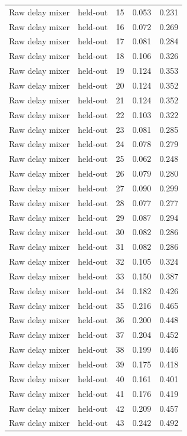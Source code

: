 \begin{tabular}{llrrr}
Raw delay mixer & held-out & 15 & 0.053 & 0.231 \\
Raw delay mixer & held-out & 16 & 0.072 & 0.269 \\
Raw delay mixer & held-out & 17 & 0.081 & 0.284 \\
Raw delay mixer & held-out & 18 & 0.106 & 0.326 \\
Raw delay mixer & held-out & 19 & 0.124 & 0.353 \\
Raw delay mixer & held-out & 20 & 0.124 & 0.352 \\
Raw delay mixer & held-out & 21 & 0.124 & 0.352 \\
Raw delay mixer & held-out & 22 & 0.103 & 0.322 \\
Raw delay mixer & held-out & 23 & 0.081 & 0.285 \\
Raw delay mixer & held-out & 24 & 0.078 & 0.279 \\
Raw delay mixer & held-out & 25 & 0.062 & 0.248 \\
Raw delay mixer & held-out & 26 & 0.079 & 0.280 \\
Raw delay mixer & held-out & 27 & 0.090 & 0.299 \\
Raw delay mixer & held-out & 28 & 0.077 & 0.277 \\
Raw delay mixer & held-out & 29 & 0.087 & 0.294 \\
Raw delay mixer & held-out & 30 & 0.082 & 0.286 \\
Raw delay mixer & held-out & 31 & 0.082 & 0.286 \\
Raw delay mixer & held-out & 32 & 0.105 & 0.324 \\
Raw delay mixer & held-out & 33 & 0.150 & 0.387 \\
Raw delay mixer & held-out & 34 & 0.182 & 0.426 \\
Raw delay mixer & held-out & 35 & 0.216 & 0.465 \\
Raw delay mixer & held-out & 36 & 0.200 & 0.448 \\
Raw delay mixer & held-out & 37 & 0.204 & 0.452 \\
Raw delay mixer & held-out & 38 & 0.199 & 0.446 \\
Raw delay mixer & held-out & 39 & 0.175 & 0.418 \\
Raw delay mixer & held-out & 40 & 0.161 & 0.401 \\
Raw delay mixer & held-out & 41 & 0.176 & 0.419 \\
Raw delay mixer & held-out & 42 & 0.209 & 0.457 \\
Raw delay mixer & held-out & 43 & 0.242 & 0.492 \\

\end{tabular}
